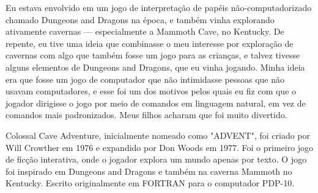 \documentclass[12pt,a4paper]{article}
\begin{document}
Eu estava envolvido em um jogo de interpretação de papéis não-computadorizado chamado Dungeons and Dragons na época, e também vinha explorando ativamente cavernas — especialmente a Mammoth Cave, no Kentucky. De repente, eu tive uma ideia que combinasse o meu interesse por exploração de cavernas com algo que também fosse um jogo para as crianças, e talvez tivesse alguns elementos de Dungeons and Dragons, que eu vinha jogando. Minha ideia era que fosse um jogo de computador que não intimidasse pessoas que não usavam computadores, e esse foi um dos motivos pelos quais eu fiz com que o jogador dirigisse o jogo por meio de comandos em linguagem natural, em vez de comandos mais padronizados. Meus filhos acharam que foi muito divertido.

Colossal Cave Adventure, inicialmente nomeado como "ADVENT", foi criado por Will Crowther em 1976 e expandido por Don Woods em 1977. Foi o primeiro jogo de ficção interativa, onde o jogador explora um mundo apenas por texto. O jogo foi inspirado em Dungeons and Dragons e também na caverna Mammoth no Kentucky. 
Escrito originalmente em FORTRAN para o computador PDP-10.


\newpage

\printbibliography
\end{document}
